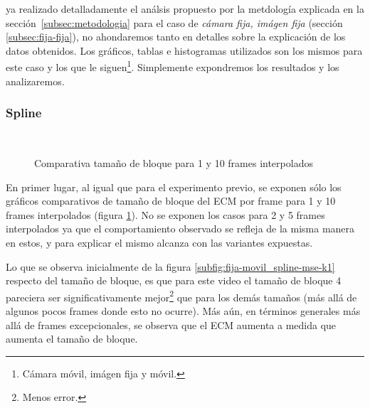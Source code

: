  ya realizado detalladamente el an\'alsis propuesto
por la metdolog\'ia explicada en la secci\'on~\ref{subsec:metodologia} para
el caso de \emph{c\'amara fija, im\'agen fija} (secci\'on
\ref{subsec:fija-fija}), no ahondaremos tanto en detalles sobre la explicaci\'on
de los datos obtenidos. Los gr\'aficos, tablas e histogramas utilizados son los
mismos para este caso y los que le siguen\footnote{C\'amara m\'ovil, im\'agen
fija y m\'ovil.}. Simplemente expondremos los resultados y los analizaremos.

\subsubsection{Spline}

\begin{figure}[H]
    \centering
    \\
    \caption{Comparativa tama\~no de bloque para 1 y 10 frames interpolados}
    \label{fig:fija-movil_spline-mse-bloques}
\end{figure}

\par En primer lugar, al igual que para el experimento previo, se exponen
s\'olo los gr\'aficos comparativos de tama\~no de bloque del ECM por frame para
1 y 10 frames interpolados (figura \ref{fig:fija-movil_spline-mse-bloques}). No
se exponen los casos para 2 y 5 frames interpolados ya que el comportamiento
observado se refleja de la misma manera en estos, y para explicar el mismo
alcanza con las variantes expuestas.

\par Lo que se observa inicialmente de la figura
\ref{subfig:fija-movil_spline-mse-k1} respecto del tama\~no de bloque, es que
para este video el tama\~no de bloque 4 pareciera ser significativamente
mejor\footnote{Menos error.} que para los dem\'as tama\~nos (m\'as all\'a de
algunos pocos frames donde esto no ocurre). M\'as a\'un, en t\'erminos generales
m\'as all\'a de frames excepcionales, se observa que el ECM aumenta a medida que
aumenta el tama\~no de bloque.

